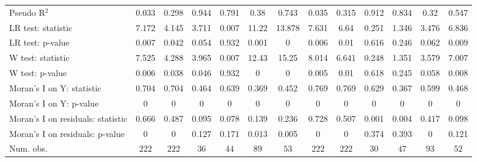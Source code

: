\begin{table}
\begin{center}
\begin{tabular}{l c c c c c c c c c c c c}
Pseudo R$^2$                      & 0.033         & 0.298         & 0.944         & 0.791          & 0.38          & 0.743         & 0.035         & 0.315         & 0.912         & 0.834          & 0.32          & 0.547         \\
LR test: statistic                & 7.172         & 4.145         & 3.711         & 0.007          & 11.22         & 13.878        & 7.631         & 6.64          & 0.251         & 1.346          & 3.476         & 6.836         \\
LR test: p-value                  & 0.007         & 0.042         & 0.054         & 0.932          & 0.001         & 0             & 0.006         & 0.01          & 0.616         & 0.246          & 0.062         & 0.009         \\
W test: statistic                 & 7.525         & 4.288         & 3.965         & 0.007          & 12.43         & 15.25         & 8.014         & 6.641         & 0.248         & 1.351          & 3.579         & 7.007         \\
W test: p-value                   & 0.006         & 0.038         & 0.046         & 0.932          & 0             & 0             & 0.005         & 0.01          & 0.618         & 0.245          & 0.058         & 0.008         \\
Moran's I on Y: statistic         & 0.704         & 0.704         & 0.464         & 0.639          & 0.369         & 0.452         & 0.769         & 0.769         & 0.629         & 0.367          & 0.599         & 0.468         \\
Moran's I on Y: p-value           & 0             & 0             & 0             & 0              & 0             & 0             & 0             & 0             & 0             & 0              & 0             & 0             \\
Moran's I on residuals: statistic & 0.666         & 0.487         & 0.095         & 0.078          & 0.139         & 0.236         & 0.728         & 0.507         & 0.001         & 0.004          & 0.417         & 0.098         \\
Moran's I on residuals: p-value   & 0             & 0             & 0.127         & 0.171          & 0.013         & 0.005         & 0             & 0             & 0.374         & 0.393          & 0             & 0.121         \\
Num. obs.                         & $222$         & $222$         & $36$          & $44$           & $89$          & $53$          & $222$         & $222$         & $30$          & $47$           & $93$          & $52$          \\

\end{tabular}
\end{center}
\end{table}
